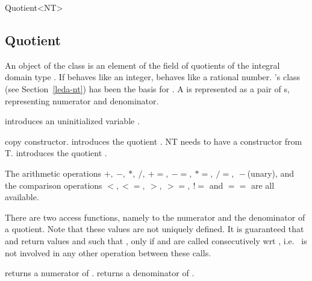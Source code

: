 
\begin{ccClassTemplate} {Quotient<NT>}
\label{Quotient}
\subsection{Quotient}

\ccDefinition
An object of the class  is an element of the 
field of quotients of the integral domain type .
If  behaves like an integer, 
behaves like a rational number. 
{\leda}'s class  (see Section~\ref{leda-nt})
has been the basis for .
A   is represented as a pair of 
s, representing numerator and denominator.


\ccCreation
{}

             {introduces an uninitialized variable \ccVar.}

\ccHidden {}
 	    {copy constructor.}
\ccGlue
{}
{introduces the quotient . NT needs to have a constructor from T.}
\ccGlue
{}
            {introduces the quotient .}


\ccOperations
The arithmetic operations $+,\ -,\ *,\ /,\ +=,\
-=,\ *=,\ /=,\ -$(unary), and
the comparison operations $<, <=,\ >,\ >=,\ !=$ and $==$ are all available.


There are two access functions, namely to the
numerator and the denominator of a quotient.
Note that these values are not uniquely defined. 
It is guaranteed that  and 
 return values  and
 such that , only
if   and  are called
consecutively wrt , i.e.~\ccStyle{q} is not involved in 
any other operation between these calls.

\clearpage
{}
       {returns a numerator of .}
\ccGlue
{}
       {returns a denominator of .}


\end{ccClassTemplate}
